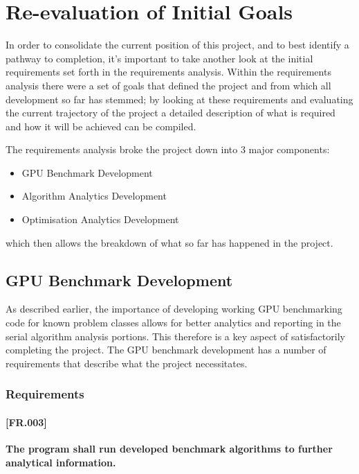 
\section{Re-evaluation of Initial Goals}
In order to consolidate the current position of this project, and to best identify a pathway to completion, it's important to take another look at the initial requirements set forth in the requirements analysis. Within the requirements analysis there were a set of goals that defined the project and from which all development so far has stemmed; by looking at these requirements and evaluating the current trajectory of the project a detailed description of what is required and how it will be achieved can be compiled.

The requirements analysis broke the project down into 3 major components:

\begin{itemize}
\item GPU Benchmark Development
\item Algorithm Analytics Development
\item Optimisation Analytics Development
\end{itemize}

which then allows the breakdown of what so far has happened in the project.

\subsection{GPU Benchmark Development}
As described earlier, the importance of developing working GPU benchmarking code for known problem classes allows for better analytics and reporting in the serial algorithm analysis portions. This therefore is a key aspect of satisfactorily completing the project. The GPU benchmark development has a number of requirements that describe what the project necessitates.

\subsubsection{Requirements}

\paragraph{[FR.003]} \label{[FR.003]}
\textbf{The program shall run developed benchmark algorithms to further analytical information.}

